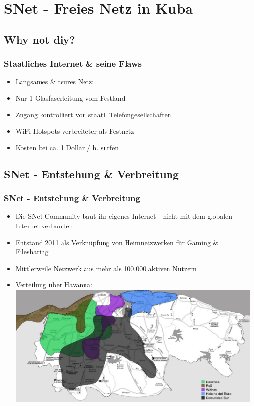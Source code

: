 \section{SNet - Freies Netz in Kuba}
\subsection{Why not diy?}

\begin{frame}
\frametitle{Staatliches Internet \& seine Flaws}
	\begin{itemize}
		\item Langsames \& teures Netz:
		\item Nur 1 Glasfaserleitung vom Festland
		\item Zugang kontrolliert von staatl. Telefongesellschaften
		\item WiFi-Hotspots verbreiteter als Festnetz
		\item Kosten bei ca. 1 Dollar / h. surfen
	\end{itemize}
\end{frame}

\subsection{SNet - Entstehung \& Verbreitung}

\begin{frame}
\frametitle{SNet - Entstehung \& Verbreitung}
	\begin{itemize}
		\item Die SNet-Community baut ihr eigenes Internet - nicht mit dem globalen Internet verbunden
		\item Entstand 2011 als Verknüpfung von Heimnetzwerken für Gaming \& Filesharing
		\item Mittlerweile Netzwerk aus mehr als 100.000 aktiven Nutzern
		\item Verteilung über Havanna:
			\includegraphics[width=\textwidth]{images/havanna_net.jpg}
	\end{itemize}
	
\end{frame}

